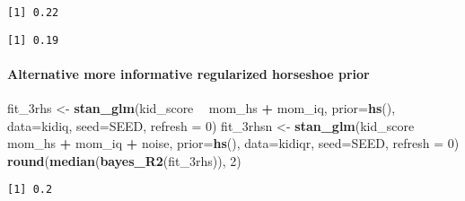 \documentclass[
]{article}
\newenvironment{Shaded}{\begin{snugshade}}{\end{snugshade}}
\newcommand{\DataTypeTok}[1]{\textcolor[rgb]{0.13,0.29,0.53}{#1}}
\newcommand{\DecValTok}[1]{\textcolor[rgb]{0.00,0.00,0.81}{#1}}
\newcommand{\KeywordTok}[1]{\textcolor[rgb]{0.13,0.29,0.53}{\textbf{#1}}}
\newcommand{\NormalTok}[1]{#1}
\newcommand{\OperatorTok}[1]{\textcolor[rgb]{0.81,0.36,0.00}{\textbf{#1}}}
\newcommand{\StringTok}[1]{\textcolor[rgb]{0.31,0.60,0.02}{#1}}
\begin{document}
\begin{verbatim}
[1] 0.22
\end{verbatim}

\begin{Shaded}
\end{Shaded}

\begin{verbatim}
[1] 0.19
\end{verbatim}

\hypertarget{alternative-more-informative-regularized-horseshoe-prior}{%
\paragraph{Alternative more informative regularized horseshoe
prior}\label{alternative-more-informative-regularized-horseshoe-prior}}

\begin{Shaded}
\begin{Highlighting}[]
\NormalTok{fit_3rhs <-}\StringTok{ }\KeywordTok{stan_glm}\NormalTok{(kid_score }\OperatorTok{~}\StringTok{ }\NormalTok{mom_hs }\OperatorTok{+}\StringTok{ }\NormalTok{mom_iq, }\DataTypeTok{prior=}\KeywordTok{hs}\NormalTok{(), }\DataTypeTok{data=}\NormalTok{kidiq,}
                     \DataTypeTok{seed=}\NormalTok{SEED, }\DataTypeTok{refresh =} \DecValTok{0}\NormalTok{)}
\NormalTok{fit_3rhsn <-}\StringTok{ }\KeywordTok{stan_glm}\NormalTok{(kid_score }\OperatorTok{~}\StringTok{ }\NormalTok{mom_hs }\OperatorTok{+}\StringTok{ }\NormalTok{mom_iq }\OperatorTok{+}\StringTok{ }\NormalTok{noise, }\DataTypeTok{prior=}\KeywordTok{hs}\NormalTok{(),}
                      \DataTypeTok{data=}\NormalTok{kidiqr, }\DataTypeTok{seed=}\NormalTok{SEED, }\DataTypeTok{refresh =} \DecValTok{0}\NormalTok{)}
\KeywordTok{round}\NormalTok{(}\KeywordTok{median}\NormalTok{(}\KeywordTok{bayes_R2}\NormalTok{(fit_3rhs)), }\DecValTok{2}\NormalTok{)}
\end{Highlighting}
\end{Shaded}

\begin{verbatim}
[1] 0.2
\end{verbatim}
\end{document}
